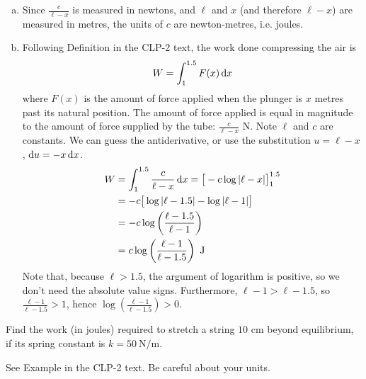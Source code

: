 \begin{solution}
\begin{enumerate}[(a)]
\item Since $\frac{c}{\ell-x}$ is measured in newtons, and $\ell$ and $x$ (and therefore $\ell-x$) are measured in metres, the units of $c$ are newton-metres, i.e. joules.
\item Following Definition  in the CLP-2 text, the work done compressing the air is
\[W = \int_1^{1.5}F(x)\,\mathrm{d}x\]
where $F(x)$ is the amount of force applied when the plunger is $x$ metres past its natural position. The amount of force applied is equal in magnitude to the amount of force supplied by the tube: $\frac{c}{\ell-x}$ N. Note $\ell$ and $c$ are constants. We can guess the antiderivative, or use the substitution $u=\ell-x$, $\mathrm{d}u=-x\,\mathrm{d}x$.
\begin{align*}
W &=\int_1^{1.5} \frac{c}{\ell-x}\,\mathrm{d}x  = \big[-c\log|\ell-x|\big]_1^{1.5}\\
&=-c\big[\log|\ell-1.5| - \log|\ell-1|\big]\\
&=-c\log\left(\frac{\ell-1.5}{\ell-1}\right)\\
&=c\log\left(\frac{\ell-1}{\ell-1.5}\right)\text{ J}\end{align*}
Note that, because $\ell>1.5$, the argument of logarithm is positive, so we don't need the absolute value signs. Furthermore, $\ell-1 > \ell-1.5$, so $\frac{\ell-1}{\ell-1.5}>1$, hence $\log\left(\frac{\ell-1}{\ell-1.5}\right)>0$.
\end{enumerate}
\end{solution}





\begin{question}[2016Q3]\label{prob_s2.1:normal1}
Find the work (in joules) required to stretch a string $10$ cm beyond
equilibrium, if its spring constant is $k=50\ \mathrm{N}/\mathrm{m}$.
\end{question}

\begin{hint}
See Example  in the
CLP-2 text. Be careful about your units.
\end{hint}

